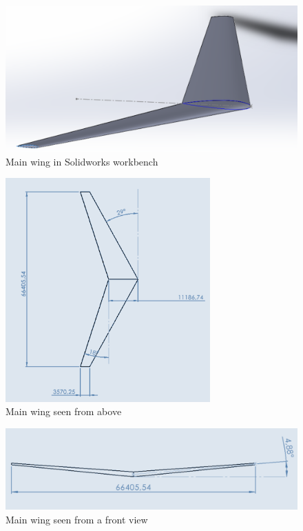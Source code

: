 \documentclass{article}
\begin{document}
\begin{figure}[h!]
    \centering
    \includegraphics[width=\textwidth]{Sources/Plots_and_Pictures/wing_solidworks.png}
    \caption{Main wing in Solidworks workbench}
    \label{wing_solidworks}
\end{figure}

\clearpage 

\begin{figure}[h!]
    \centering
    \includegraphics[width=0.7\textwidth]{Sources/Plots_and_Pictures/wingCAD_above.png}
    \caption{Main wing seen from above}
    \label{wing_above}
\end{figure}

\begin{figure}[h!]
    \centering
    \includegraphics[width=\textwidth]{Sources/Plots_and_Pictures/wingCAD_side.png}
    \caption{Main wing seen from a front view}
    \label{wing_front}
\end{figure}
\end{document}
